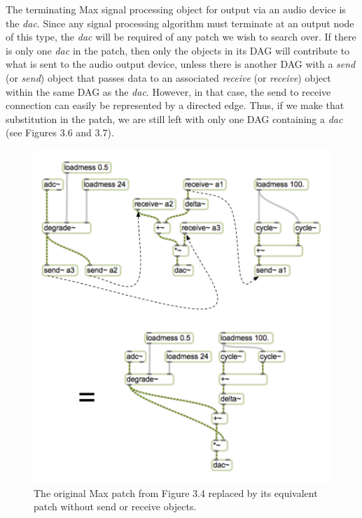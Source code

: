 \documentclass[12pt]{report} 	%
\numberwithin{figure}{chapter}
\numberwithin{table}{chapter}
\numberwithin{equation}{chapter}
\begin{document}
\begin{flushleft}
The terminating Max signal processing object for output via an audio device is the \textit{dac\texttildelow{}}. Since any signal processing algorithm must terminate at an output node of this type, the \textit{dac\texttildelow{}} will be required of any patch we wish to search over. If there is only one \textit{dac\texttildelow{}} in the patch, then only the objects in its DAG will contribute to what is sent to the audio output device, unless there is another DAG with a \textit{send\texttildelow{}} (or \textit{send}) object that passes data to an associated \textit{receive\texttildelow{}} (or \textit{receive}) object within the same DAG as the \textit{dac\texttildelow{}}. However, in that case, the send to receive connection can easily be represented by a directed edge. Thus, if we make that substitution in the patch, we are still left with only one DAG containing a \textit{dac\texttildelow{}} (see Figures 3.6 and 3.7).
\begin{figure}[h!]
\begin{center}
\includegraphics[scale=0.75]{MaxDAGsSendReceive1}
\caption[Removing send\texttildelow{} and receive\texttildelow{} objects]{The original Max patch from Figure 3.4 replaced by its equivalent patch without send\texttildelow{} or receive\texttildelow{} objects.}

\end{center}
\end{figure}
\end{flushleft}
\end{document}
